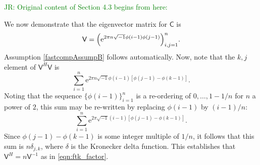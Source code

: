 \documentclass[twocolumn]{svjour3}          %
\newcommand{\mC}{\mathsf{C}}
\newcommand{\mV}{\mathsf{V}}
\newcommand{\me}{\mathrm{e}}
\newcommand{\JRNote}[1]{{\textcolor{green}{JR: #1}}}
\begin{document}
\iftrue
\JRNote{Original content of Section 4.3 begins from here:}


We now demonstrate that the eigenvector matrix for $\mC$ is 
\begin{align} \label{latticeVdef}
\mV = \Bigl ( \me^{2 \pi n \sqrt{-1} \phi(i-1)\phi(j-1)} \Bigr)_{i,j = 1}^n.
\end{align}
Assumption \eqref{fastcompAssumpB} follows automatically.
Now, note that the $k,j$ element of $\mV^H\mV$ is
\begin{equation*}
\sum_{i=1}^n \me^{2 \pi n \sqrt{-1} \phi(i-1)[\phi(j-1) - \phi(k-1)]} .
\end{equation*}
Noting that the sequence $\{\phi(i-1)\}_{i=1}^n$ is a re-ordering of $0, \ldots, 1-1/n$ for $n$ a power of $2$, this sum may be re-written by replacing $\phi(i-1)$ by $(i-1)/n$:
\begin{equation*}
\sum_{i=1}^n \me^{2 \pi \sqrt{-1} (i-1)[\phi(j-1) - \phi(k-1)]}.
\end{equation*}
Since $\phi(j-1) - \phi(k-1)$ is some integer multiple of $1/n$, it follows that this sum is $n \delta_{j,k}$, where $\delta$ is the Kronecker delta function.  This establishes that $\mV^H = n \mV^{-1}$ as in \eqref{eqn:ftk_factor}.
\end{document}
